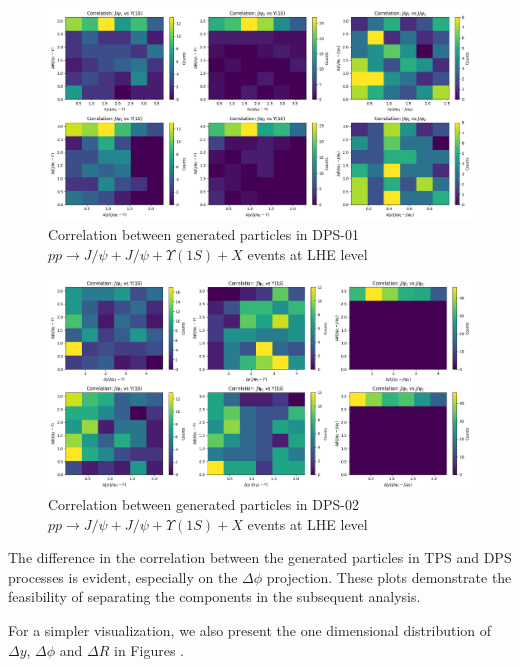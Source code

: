 \documentclass[10pt,twocolumn]{article}
\begin{document}
\begin{figure}
    \centering
    \includegraphics[width=1.0\linewidth]{images/yabs_LHE_LEVEL_DPS_JY1S_J_correlation_filtered_p2.png}
    \caption{Correlation between generated particles in DPS-01 $pp\to J/\psi+J/\psi+\Upsilon(1S)+X$ events at LHE level}
    \label{fig:TPS_JJY1S_filtered_correlation_LHE}
\end{figure}

\begin{figure}
    \centering
    \includegraphics[width=1.0\linewidth]{images/yabs_LHE_LEVEL_DPS_JJ_Y1S_correlation_filtered_p2.png}
    \caption{Correlation between generated particles in DPS-02 $pp\to J/\psi+J/\psi+\Upsilon(1S)+X$ events at LHE level}
    \label{fig:TPS_JJY1S_filtered_correlation_LHE}
\end{figure}

The difference in the correlation between the generated particles in TPS and DPS processes is evident, especially on the $\Delta \phi$ projection. These plots demonstrate the feasibility of separating the components in the subsequent analysis.

For a simpler visualization, we also present the one dimensional distribution of $\Delta y$, $\Delta \phi$ and $\Delta R$ in Figures .
\end{document}
